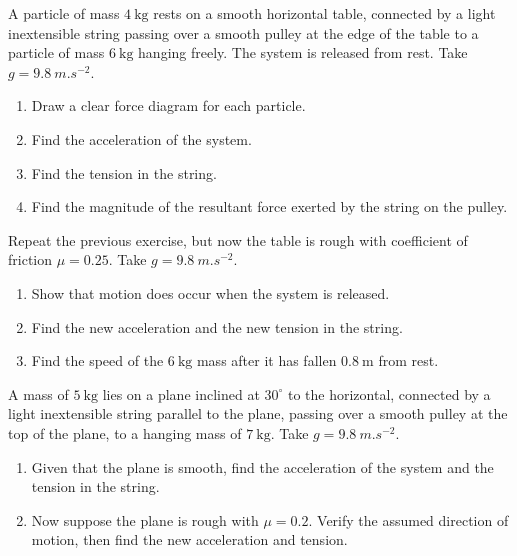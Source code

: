 \documentclass[11pt]{article}
\newcounter{popsec}
\newcounter{popsub}
\newcommand{\courssub}[1]{%
  \stepcounter{popsub}%
  \par\vspace{9pt}\noindent{\popxbold\fontsize{11.5}{13}\selectfont\color{popink}{\color{poporange}\thepopsec.\thepopsub}\hspace{6pt}#1}\par\nopagebreak\vspace{4pt}
}
\begin{document}
\courssub{I practise}

\begin{exercice}
A particle of mass $4\ \mathrm{kg}$ rests on a smooth horizontal table, connected by a light inextensible string passing over a smooth pulley at the edge of the table to a particle of mass $6\ \mathrm{kg}$ hanging freely. The system is released from rest. Take $g = \SI{9.8}{m.s^{-2}}$.
\begin{enumerate}
\item Draw a clear force diagram for each particle.
\item Find the acceleration of the system.
\item Find the tension in the string.
\item Find the magnitude of the resultant force exerted by the string on the pulley.
\end{enumerate}
\end{exercice}

\begin{exercice}
Repeat the previous exercise, but now the table is rough with coefficient of friction $\mu = 0.25$. Take $g = \SI{9.8}{m.s^{-2}}$.
\begin{enumerate}
\item Show that motion does occur when the system is released.
\item Find the new acceleration and the new tension in the string.
\item Find the speed of the $6\ \mathrm{kg}$ mass after it has fallen $0.8\ \mathrm{m}$ from rest.
\end{enumerate}
\end{exercice}

\begin{exercice}
A mass of $5\ \mathrm{kg}$ lies on a plane inclined at $30^{\circ}$ to the horizontal, connected by a light inextensible string parallel to the plane, passing over a smooth pulley at the top of the plane, to a hanging mass of $7\ \mathrm{kg}$. Take $g = \SI{9.8}{m.s^{-2}}$.
\begin{enumerate}
\item Given that the plane is smooth, find the acceleration of the system and the tension in the string.
\item Now suppose the plane is rough with $\mu = 0.2$. Verify the assumed direction of motion, then find the new acceleration and tension.
\end{enumerate}
\end{exercice}
\end{document}
